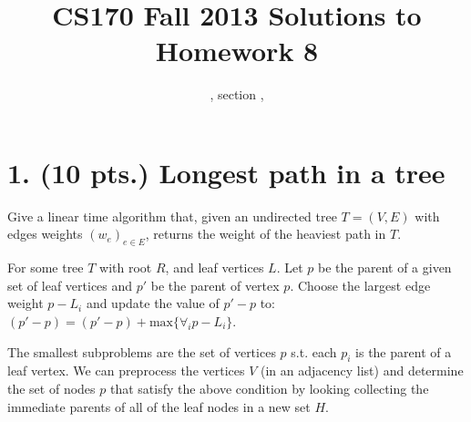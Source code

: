 \documentclass[11pt]{article}
\title{CS170  Fall 2013 Solutions to Homework 8}
\author{\Name, section \Sec, \texttt{\Login}}
\begin{document}
\maketitle

\section*{1. (10 pts.) Longest path in a tree}

Give a linear time algorithm that, given an undirected tree $T = (V,E)$ with edges weights
$(w_e)_{e \in E}$, returns the weight of the heaviest path in $T$.



For some tree $T$ with root $R$, and leaf vertices $L$. Let $p$ be the parent 
of a given set of leaf vertices and $p'$ be the parent of vertex $p$.
Choose the largest edge weight $p-L_i$ and update the value of 
$p'-p$ to: $(p'-p)=(p'-p)+\mbox{max}\{\forall_i p-L_i\}$. 

The smallest subproblems are the set of vertices $p$ s.t. each $p_i$ is 
the parent of a leaf vertex. We can preprocess the vertices $V$ (in an adjacency
list) and determine the set of nodes $p$ that satisfy the above 
condition by looking collecting the immediate parents of all of the leaf
nodes in a new set $H$. 
\end{document}
